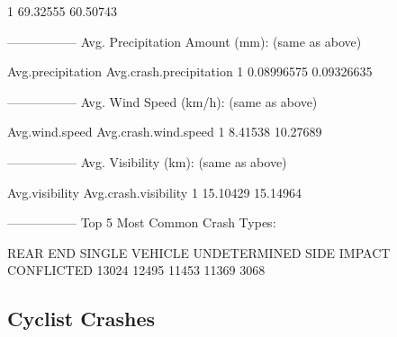 \documentclass[11pt, a4paper]{article}
\begin{document}
\begin{Schunk}
\begin{Soutput}
1     69.32555           60.50743
\end{Soutput}
\begin{Soutput}
-----------------
Avg. Precipitation Amount (mm): (same as above)
\end{Soutput}
\begin{Soutput}
  Avg.precipitation Avg.crash.precipitation
1        0.08996575              0.09326635
\end{Soutput}
\begin{Soutput}
-----------------
Avg. Wind Speed (km/h): (same as above)
\end{Soutput}
\begin{Soutput}
  Avg.wind.speed Avg.crash.wind.speed
1        8.41538             10.27689
\end{Soutput}
\begin{Soutput}
-----------------
Avg. Visibility (km): (same as above)
\end{Soutput}
\begin{Soutput}
  Avg.visibility Avg.crash.visibility
1       15.10429             15.14964
\end{Soutput}
\begin{Soutput}
-----------------
Top 5 Most Common Crash Types:
\end{Soutput}
\begin{Soutput}
      REAR END SINGLE VEHICLE   UNDETERMINED    SIDE IMPACT     CONFLICTED 
         13024          12495          11453          11369           3068 
\end{Soutput}
\end{Schunk}




\pagebreak
\subsection{Cyclist Crashes}
\end{document}
